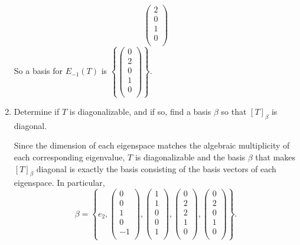 \documentclass{eh-homework}
\begin{document}
\begin{question}{2}
\begin{enumerate}[label=(\alph*)]
\[\begin{pmatrix}
                 2 \\
                 0 \\
                 1 \\
                 0 \\
            \end{pmatrix}
        \]
        So a basis for \(E_{-1}(T)\) is \(\left\{ \begin{pmatrix}
            0 \\
            2 \\
            0 \\
            1 \\
            0 \\
       \end{pmatrix} \right\}\).

        \item Determine if $T$ is diagonalizable, and if so, find a basis $\beta$ so that $[T]_\beta$ is diagonal.
        
        Since the dimension of each eigenspace matches the algebraic multiplicity of each corresponding eigenvalue, \(T\) is diagonalizable and the basis \(\beta\) that makes \([T]_\beta\) diagonal is exactly the basis consisting of the basis vectors of each eigenspace. In particular,
        \[
            \beta = \left\{ e_2, \begin{pmatrix}
                0 \\
                0 \\
                1 \\
                0 \\
                -1 \\
           \end{pmatrix},\begin{pmatrix}
            1 \\
            1 \\
            0 \\
            0 \\
            1 \\
       \end{pmatrix},\begin{pmatrix}
            0 \\
            2 \\
            2 \\
            1 \\
            0 \\
        \end{pmatrix},\begin{pmatrix}
            0 \\
            2 \\
            0 \\
            1 \\
            0 \\
       \end{pmatrix} \right\}.
        \]
    \end{enumerate}
    \end{question}
    
\end{document}
